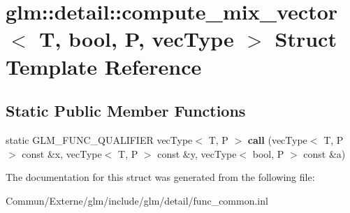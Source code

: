 \hypertarget{structglm_1_1detail_1_1compute__mix__vector_3_01_t_00_01bool_00_01_p_00_01vec_type_01_4}{}\section{glm\+:\+:detail\+:\+:compute\+\_\+mix\+\_\+vector$<$ T, bool, P, vec\+Type $>$ Struct Template Reference}
\label{structglm_1_1detail_1_1compute__mix__vector_3_01_t_00_01bool_00_01_p_00_01vec_type_01_4}
\subsection*{Static Public Member Functions}
\begin{DoxyCompactItemize}
\item 
static G\+L\+M\+\_\+\+F\+U\+N\+C\+\_\+\+Q\+U\+A\+L\+I\+F\+I\+ER vec\+Type$<$ T, P $>$ {\bfseries call} (vec\+Type$<$ T, P $>$ const \&x, vec\+Type$<$ T, P $>$ const \&y, vec\+Type$<$ bool, P $>$ const \&a)\hypertarget{structglm_1_1detail_1_1compute__mix__vector_3_01_t_00_01bool_00_01_p_00_01vec_type_01_4_a8c1f32466902b61e306585f11d903212}{}\label{structglm_1_1detail_1_1compute__mix__vector_3_01_t_00_01bool_00_01_p_00_01vec_type_01_4_a8c1f32466902b61e306585f11d903212}

\end{DoxyCompactItemize}


The documentation for this struct was generated from the following file\+:\begin{DoxyCompactItemize}
\item 
Commun/\+Externe/glm/include/glm/detail/func\+\_\+common.\+inl\end{DoxyCompactItemize}
